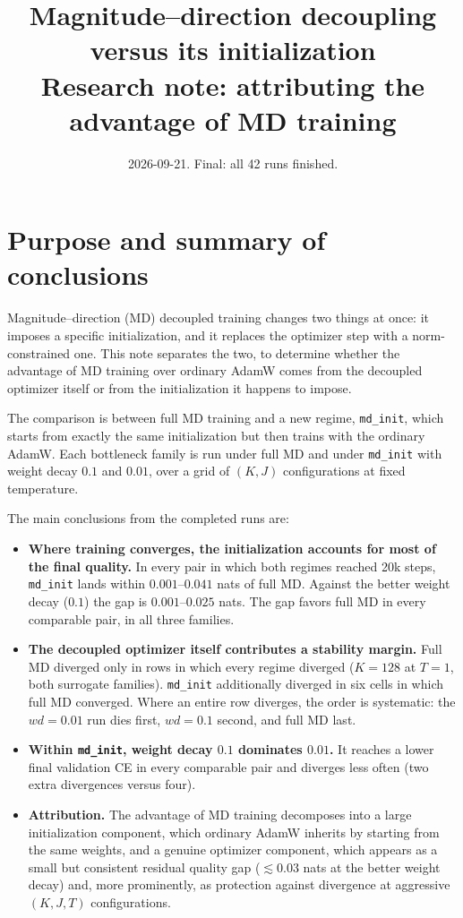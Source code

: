 \documentclass[11pt,a4paper]{article}
\title{Magnitude--direction decoupling versus its initialization\\[2pt]
\large Research note: attributing the advantage of MD training}
\author{}
\date{2026-09-21. Final: all 42 runs finished.}
\newcommand{\code}[1]{\texttt{#1}}
\begin{document}
\maketitle
\vspace{-2em}

\section{Purpose and summary of conclusions}

Magnitude--direction (MD) decoupled training changes two things at once: it
imposes a specific initialization, and it replaces the optimizer step with a
norm-constrained one. This note separates the two, to determine whether the
advantage of MD training over ordinary AdamW comes from the decoupled
optimizer itself or from the initialization it happens to impose.

The comparison is between full MD training and a new regime, \code{md\_init},
which starts from exactly the same initialization but then trains with the
ordinary AdamW. Each bottleneck family is run under full MD and under
\code{md\_init} with weight decay $0.1$ and $0.01$, over a grid of $(K,J)$
configurations at fixed temperature.

The main conclusions from the completed runs are:

\begin{itemize}[leftmargin=1.4em]
\item \textbf{Where training converges, the initialization accounts for most
of the final quality.} In every pair in which both regimes reached 20k steps,
\code{md\_init} lands within $0.001$--$0.041$ nats of full MD. Against the
better weight decay ($0.1$) the gap is $0.001$--$0.025$ nats. The gap favors
full MD in every comparable pair, in all three families.

\item \textbf{The decoupled optimizer itself contributes a stability margin.}
Full MD diverged only in rows in which every regime diverged ($K=128$ at
$T=1$, both surrogate families). \code{md\_init} additionally diverged in six
cells in which full MD converged. Where an entire row diverges, the order is
systematic: the $wd=0.01$ run dies first, $wd=0.1$ second, and full MD last.

\item \textbf{Within \code{md\_init}, weight decay $0.1$ dominates $0.01$.}
It reaches a lower final validation CE in every comparable pair and diverges
less often (two extra divergences versus four).

\item \textbf{Attribution.} The advantage of MD training decomposes into a
large initialization component, which ordinary AdamW inherits by starting
from the same weights, and a genuine optimizer component, which appears as a
small but consistent residual quality gap ($\lesssim 0.03$ nats at the
better weight decay) and, more prominently, as protection against divergence
at aggressive $(K,J,T)$ configurations.
\end{itemize}
\end{document}
